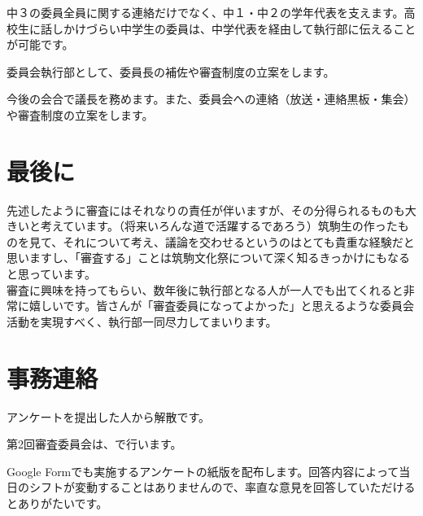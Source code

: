 \documentclass[paper=b4j, landscape, fleqn, jafontsize=8pt, jafontscale=1, head_space=25.5mm, foot_space=15mm, fore-edge=14.5mm, gutter=14.5mm, hanging_punctuation]{jlreq}
\begin{document}
\begin{normalmaterial}
中３の委員全員に関する連絡だけでなく、中１・中２の学年代表を支えます。高校生に話しかけづらい中学生の委員は、中学代表を経由して執行部に伝えることが可能です。

委員会執行部として、委員長の補佐や審査制度の立案をします。

今後の会合で議長を務めます。また、委員会への連絡（放送・連絡黒板・集会）や審査制度の立案をします。

\section{最後に}
先述したように審査にはそれなりの責任が伴いますが、その分得られるものも大きいと考えています。（将来いろんな道で活躍するであろう）筑駒生の作ったものを見て、それについて考え、議論を交わせるというのはとても貴重な経験だと思いますし、「審査する」ことは筑駒文化祭について深く知るきっかけにもなると思っています。\\
審査に興味を持ってもらい、数年後に執行部となる人が一人でも出てくれると非常に嬉しいです。皆さんが「審査委員になってよかった」と思えるような委員会活動を実現すべく、執行部一同尽力してまいります。

\section{事務連絡}
\begin{reitemize}
    \item アンケートを提出した人から解散です。
    \item 第2回審査委員会は、で行います。
    \item Google Formでも実施するアンケートの紙版を配布します。回答内容によって当日のシフトが変動することはありませんので、率直な意見を回答していただけるとありがたいです。
\end{reitemize}
\end{normalmaterial}
\end{document}
